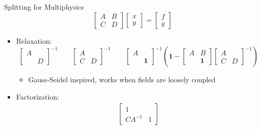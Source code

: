 \begin{frame}{Splitting for Multiphysics}
  \begin{equation*}
    \begin{bmatrix}
      A & B \\ C & D
    \end{bmatrix}
    \begin{bmatrix}
      x \\ y
    \end{bmatrix}
    =
    \begin{bmatrix}
      f \\ g
    \end{bmatrix}
  \end{equation*}
  \begin{itemize}\item Relaxation:
    \begin{equation*}
      \begin{bmatrix}
        A & \\  & D
      \end{bmatrix}^{-1} \qquad 
      \begin{bmatrix}
        A & \\ C & D
      \end{bmatrix}^{-1} \qquad
      \begin{bmatrix}
        A & \\  & \bm 1
      \end{bmatrix}^{-1}
      \left(
        \bm 1 -
        \begin{bmatrix}
          A & B \\ & \bm 1
        \end{bmatrix}
        \begin{bmatrix}
          A & \\ C & D
        \end{bmatrix}^{-1}
      \right)
    \end{equation*}
    \begin{itemize}
    \item Gauss-Seidel inspired, works when fields are loosely coupled
    \end{itemize}
  \item Factorization: 
    \begin{align*}
      \begin{bmatrix}
        1 & \\ CA^{-1} & 1
      \end{bmatrix}

\end{align*}
\end{itemize}
\end{frame}
